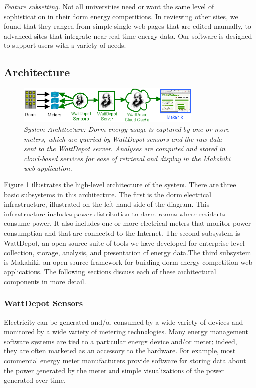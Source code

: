 {\em Feature subsetting.} Not all universities need or want the same 
level of sophistication in their dorm energy competitions.  In reviewing 
other sites, we found that they ranged from simple single web pages that are 
edited manually, to advanced sites that integrate near-real time energy data. 
Our software is designed to support users with a variety of needs. 

\subsection{Architecture}

\begin{figure}[!th]
  \center
  \includegraphics[width=0.8\textwidth]{architecture.eps}
  \caption{\em \small System Architecture: Dorm energy usage is captured by one or more meters, which 
are queried by WattDepot sensors and the raw data sent to the WattDepot server. Analyses are computed
and stored in cloud-based services for ease of retrieval and display in the Makahiki web application.}
  \label{fig:architecture}
\end{figure} 

Figure \ref{fig:architecture} illustrates the high-level architecture of
the system. There are three basic subsystems in this architecture.  The
first is the dorm electrical infrastructure, illustrated on the left hand
side of the diagram.  This infrastructure includes power distribution to
dorm rooms where residents consume power.  It also includes one or more
electrical meters that monitor power consumption and that are connected to
the Internet.  The second subsystem is WattDepot, an open source suite of
tools we have developed for enterprise-level collection, storage, analysis,
and presentation of energy data.The third subsystem is Makahiki, an open
source framework for building dorm energy competition web applications.
The following sections discuss each of these architectural components in
more detail.

\subsubsection{WattDepot Sensors}

Electricity can be generated and/or consumed by a wide variety of devices
and monitored by a wide variety of metering technologies.  Many energy
management software systems are tied to a particular energy device and/or
meter; indeed, they are often marketed as an accessory to the hardware.
For example, most commercial energy meter manufacturers provide software
for storing data about the power generated by the meter and simple
visualizations of the power generated over time.

